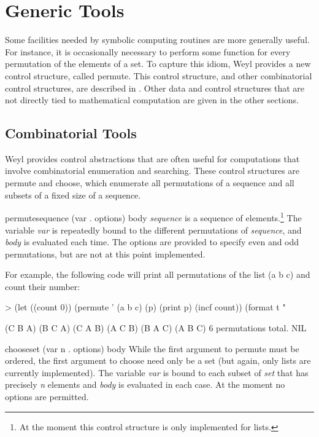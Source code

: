 
\chapter{Generic Tools}
\label{GenericTools:Chap}
  
Some facilities needed by symbolic computing routines are more
generally useful. For instance, it is occasionally necessary to
perform some function for every permutation of the elements of a set.
To capture this idiom, Weyl provides a new control structure, called
{\sf permute}. This control structure, and other combinatorial control
structures, are described in . Other data and
control structures that are not directly tied to mathematical
computation are given in the other sections.

\section{Combinatorial Tools}
\label{CombinTools:Sec}
  
Weyl provides control abstractions that are often useful for
computations that involve combinatorial enumeration and
searching. These control structures are {\sf permute} and {\sf choose},
which enumerate all permutations of a sequence and all subsets of a
fixed size of a sequence.
  
\begin{specialdef}{permute}{sequence (var . options) \body body}
{\em sequence} is a sequence of elements.\footnote{At the moment this
control structure is only implemented for lists.}  The variable {\em
var} is repeatedly bound to the different permutations of {\em
sequence}, and {\em body} is evaluated each time. The options are
provided to specify even and odd permutations, but are not at this
point implemented.
\end{specialdef}
  
For example, the following code will print all permutations of the
list {\sf (a b c)} and count their number:
\begin{code}
> (let ((count 0))
    (permute ' (a b c) (p)
      (print p)
      (incf count)) 
    (format t "~%
  
(C B A)
(B C A)
(C A B)
(A C B)
(B A C)
(A B C)
6 permutations total.
NIL
\end{code}
  
\begin{specialdef}{choose}{set (var n . options) \body body}
While the first argument to {\sf permute} must be ordered, the first
argument to {\sf choose} need only be a set (but again, only lists are
currently implemented). The variable {\em var} is bound to each subset
of {\em set} that has precisely {\em n} elements and {\em body }is
evaluated in each case. At the moment no options are permitted.
\end{specialdef}
  
